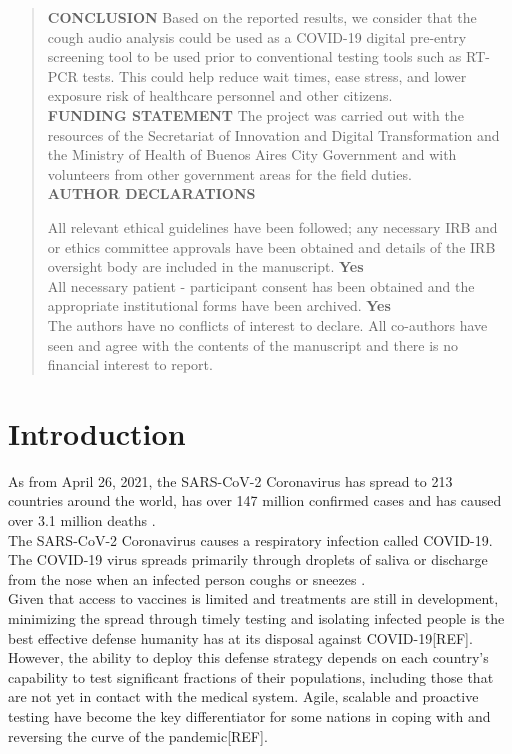 \documentclass{nle}
\begin{document}
\begin{abstract}
\textbf{CONCLUSION} Based on the reported results, we consider that the cough audio analysis could be used as a COVID-19 digital pre-entry screening tool to be used prior to conventional testing tools such as RT-PCR tests. This could help reduce wait times, ease stress, and lower exposure risk of healthcare personnel and other citizens.\\

\textbf{FUNDING STATEMENT} The project was carried out with the resources of the Secretariat of Innovation and Digital Transformation and the Ministry of Health of Buenos Aires City Government and with volunteers from other government areas for the field duties.\\

\textbf{AUTHOR DECLARATIONS}

All relevant ethical guidelines have been followed; any necessary IRB and or ethics committee approvals have been obtained and details of the IRB oversight body are included in the manuscript. \textbf{Yes}\\

All necessary patient - participant consent has been obtained and the appropriate institutional forms have been archived. \textbf{Yes}\\

The authors have no conflicts of interest to declare. All co-authors have seen and agree with the contents of the manuscript and there is no financial interest to report.
\end{abstract}

\section{Introduction}

As from April 26, 2021, the SARS-CoV-2 Coronavirus has spread to 213 countries around the world, has over 147 million confirmed cases and has caused over 3.1 million deaths \cite{1} \cite{22}.\\

The SARS-CoV-2 Coronavirus causes a respiratory infection called COVID-19.  The COVID-19 virus spreads primarily through droplets of saliva or discharge from the nose when an infected person coughs or sneezes \cite{36}.\\

Given that access to vaccines is limited and treatments are still in development, minimizing the spread through timely testing and isolating infected people is the best effective defense humanity has at its disposal against COVID-19[REF]. However, the ability to deploy this defense strategy depends on each  country’s capability to test significant fractions of their populations, including those that are not yet in contact with the medical system. Agile, scalable and proactive testing have become the key differentiator for some nations in coping with and reversing the curve of the pandemic[REF].
\end{document}
